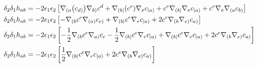 \begin{align*}
    \delta_2\delta_1h_{ab}&=-2\epsilon_1\epsilon_2\left[\nabla_{(a}\qty(c_{d)})\nabla_{b)}c^d+\nabla_{(b|}\qty(c^e)\nabla_ec_{|a)}+c^e\nabla_{(b|}\nabla_ec_{|a)}+c^e\nabla_e\nabla_{(a}c_{b)}\right]\\
    \delta_2\delta_1h_{ab}&=-2\epsilon_1\epsilon_2\left[-\nabla_{(b}c^e\nabla_{(a)}c_{e)}+\nabla_{(b|}c^e\nabla_ec_{|a)}+2c^e\nabla_{(b}\nabla_{e)}c_{a)}\right]\\
    \delta_2\delta_1h_{ab}&=-2\epsilon_1\epsilon_2\left[-\frac12\nabla_{(b}c^e\nabla_{a)}c_{e}-\frac12\nabla_{(b|}c^e\nabla_{e}c_{|a)}+\nabla_{(b|}c^e\nabla_ec_{|a)}+2c^e\nabla_{(b}\nabla_{e)}c_{a)}\right]\\
    \delta_2\delta_1h_{ab}&=-2\epsilon_1\epsilon_2\left[\frac12\nabla_{(b|}c^e\nabla_ec_{|a)}+2c^e\nabla_{(b}\nabla_{e)}c_{a)}\right]\\
\end{align*}